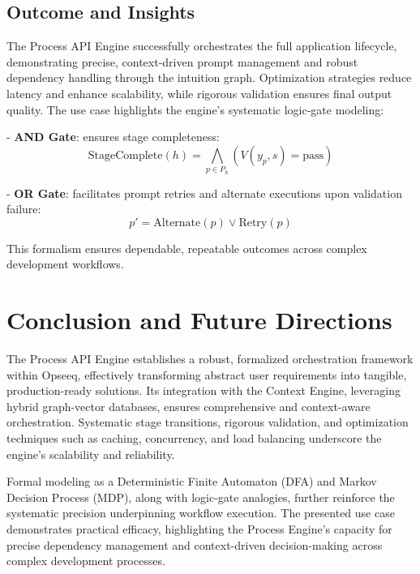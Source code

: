 \documentclass[11pt,a4paper]{article}
\begin{document}
\subsection{Outcome and Insights}
\label{subsec:outcome_insights}

The Process API Engine successfully orchestrates the full application lifecycle, demonstrating precise, context-driven prompt management and robust dependency handling through the intuition graph. Optimization strategies reduce latency and enhance scalability, while rigorous validation ensures final output quality. The use case highlights the engine's systematic logic-gate modeling:

- \textbf{AND Gate}: ensures stage completeness:
\[
\text{StageComplete}(h)=\bigwedge_{p\in P_h}(V(y_p,s)=\text{pass})
\]

- \textbf{OR Gate}: facilitates prompt retries and alternate executions upon validation failure:
\[
p'=\text{Alternate}(p)\lor\text{Retry}(p)
\]

This formalism ensures dependable, repeatable outcomes across complex development workflows.

\section{Conclusion and Future Directions}
\label{sec:conclusion}

The Process API Engine establishes a robust, formalized orchestration framework within Opseeq, effectively transforming abstract user requirements into tangible, production-ready solutions. Its integration with the Context Engine, leveraging hybrid graph-vector databases, ensures comprehensive and context-aware orchestration. Systematic stage transitions, rigorous validation, and optimization techniques such as caching, concurrency, and load balancing underscore the engine’s scalability and reliability.

Formal modeling as a Deterministic Finite Automaton (DFA) and Markov Decision Process (MDP), along with logic-gate analogies, further reinforce the systematic precision underpinning workflow execution. The presented use case demonstrates practical efficacy, highlighting the Process Engine's capacity for precise dependency management and context-driven decision-making across complex development processes.
\end{document}
